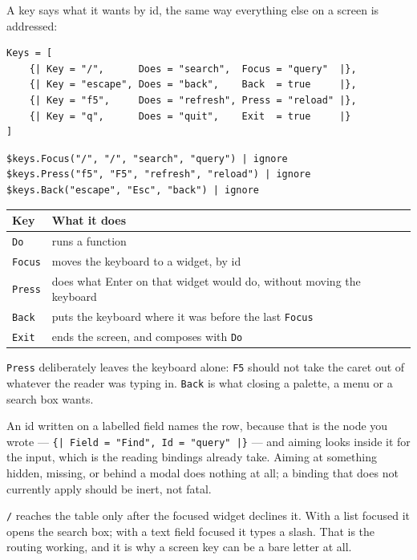 \documentclass[11pt,a4paper,twoside,openany]{book}
\newcommand{\code}[1]{\texttt{\small #1}}
\begin{document}
A key says what it wants by id, the same way everything else on a screen is
addressed:

\begin{lstlisting}
Keys = [
    {| Key = "/",      Does = "search",  Focus = "query"  |},
    {| Key = "escape", Does = "back",    Back  = true     |},
    {| Key = "f5",     Does = "refresh", Press = "reload" |},
    {| Key = "q",      Does = "quit",    Exit  = true     |}
]
\end{lstlisting}

\begin{lstlisting}
$keys.Focus("/", "/", "search", "query") | ignore
$keys.Press("f5", "F5", "refresh", "reload") | ignore
$keys.Back("escape", "Esc", "back") | ignore
\end{lstlisting}

\begin{center}
\begin{tabular}{@{}ll@{}}
\toprule
\textbf{\normalfont\sffamily Key} & \textbf{\normalfont\sffamily What it does} \\
\midrule
\code{Do}    & runs a function \\
\code{Focus} & moves the keyboard to a widget, by id \\
\code{Press} & does what Enter on that widget would do, without moving the keyboard \\
\code{Back}  & puts the keyboard where it was before the last \code{Focus} \\
\code{Exit}  & ends the screen, and composes with \code{Do} \\
\bottomrule
\end{tabular}
\end{center}

\code{Press} deliberately leaves the keyboard alone: \code{F5} should not take the
caret out of whatever the reader was typing in. \code{Back} is what closing a
palette, a menu or a search box wants.

An id written on a labelled field names the row, because that is the node you
wrote --- \code{\{| Field = "Find", Id = "query" |\}} --- and aiming looks inside it
for the input, which is the reading bindings already take. Aiming at something
hidden, missing, or behind a modal does nothing at all; a binding that does not
currently apply should be inert, not fatal.

\begin{warnbox}
\code{/} reaches the table only after the focused widget declines it. With a list
focused it opens the search box; with a text field focused it types a slash. That
is the routing working, and it is why a screen key can be a bare letter at all.
\end{warnbox}
\end{document}
